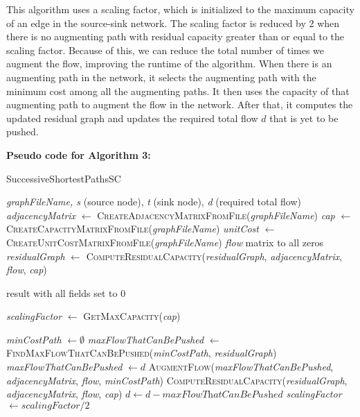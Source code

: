 \documentclass{article}
\begin{document}
This algorithm uses a scaling factor, which is initialized to the maximum capacity of an edge in the source-sink network. The scaling factor is reduced by 2 when there is no augmenting path with residual capacity greater than or equal to the scaling factor. Because of this, we can reduce the total number of times we augment the flow, improving the runtime of the algorithm. When there is an augmenting path in the network, it selects the augmenting path with the minimum cost among all the augmenting paths. It then uses the capacity of that augmenting path to augment the flow in the network. After that, it computes the updated residual graph and updates the required total flow \(d\) that is yet to be pushed.~\cite{clrs}

\textbf{Pseudo code for Algorithm 3:}

\begin{algorithm}[H]
\caption{\textcolor{keywordcolor}{SuccessiveShortestPathsSC}}
\begin{algorithmic}[1]
\State {} \textit{graphFileName, s} (source node), \textit{t} (sink node), \textit{d} (required total flow)
\State \textit{adjacencyMatrix} $\gets$ \textcolor{identifiercolor}{\textsc{CreateAdjacencyMatrixFromFile}}(\textit{graphFileName})
\State \textit{cap} $\gets$ \textcolor{identifiercolor}{\textsc{CreateCapacityMatrixFromFile}}(\textit{graphFileName})
\State \textit{unitCost} $\gets$ \textcolor{identifiercolor}{\textsc{CreateUnitCostMatrixFromFile}}(\textit{graphFileName})
\State {} \textit{flow} matrix to all zeros
\State \textit{residualGraph} $\gets$ \textcolor{identifiercolor}{\textsc{ComputeResidualCapacity}}(\textit{residualGraph}, \textit{adjacencyMatrix}, \textit{flow}, \textit{cap})

    \State \Return result with all fields set to 0
\EndIf

\State \textit{scalingFactor} $\gets$ \textcolor{identifiercolor}{\textsc{GetMaxCapacity}}(\textit{cap})

        \State {} \textit{minCostPath} $\gets \emptyset$
        \State \textit{maxFlowThatCanBePushed} $\gets$ \textcolor{identifiercolor}{\textsc{FindMaxFlowThatCanBePushed}}(\textit{minCostPath}, \textit{residualGraph})
            \State \textit{maxFlowThatCanBePushed} $\gets d$
        \EndIf
        \State \textcolor{identifiercolor}{\textsc{AugmentFlow}}(\textit{maxFlowThatCanBePushed}, \textit{adjacencyMatrix}, \textit{flow}, \textit{minCostPath})
        \State \textcolor{identifiercolor}{\textsc{ComputeResidualCapacity}}(\textit{residualGraph}, \textit{adjacencyMatrix}, \textit{flow}, \textit{cap})
        \State $d \gets d - \textit{maxFlowThatCanBePushed}$
    \EndWhile
    \State \textit{scalingFactor} $\gets \textit{scalingFactor} / 2$
\EndWhile


\end{algorithmic}
\end{algorithm}
\end{document}
